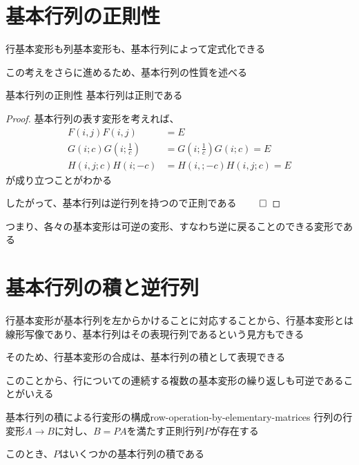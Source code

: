 \documentclass[../../../topic_linear-algebra]{subfiles}
\begin{document}
\sectionline
\section{基本行列の正則性}

行基本変形も列基本変形も、基本行列によって定式化できる

この考えをさらに進めるため、基本行列の性質を述べる

\begin{theorem*}{基本行列の正則性}
  基本行列は正則である
\end{theorem*}

\begin{proof}
  基本行列の表す変形を考えれば、
  \begin{align*}
    F(i,j)F(i,j)           & = E                          \\
    G(i;c)G(i;\frac{1}{c}) & = G(i;\frac{1}{c})G(i;c) = E \\
    H(i,j;c)H(i;-c)        & = H(i,;-c)H(i,j;c) = E
  \end{align*}
  が成り立つことがわかる

  したがって、基本行列は逆行列を持つので正則である $\qed$
\end{proof}

つまり、各々の基本変形は可逆の変形、すなわち逆に戻ることのできる変形である

\sectionline
\section{基本行列の積と逆行列}

行基本変形が基本行列を左からかけることに対応することから、行基本変形とは線形写像であり、基本行列はその表現行列であるという見方もできる

\br

そのため、行基本変形の合成は、基本行列の積として表現できる

\br

このことから、行についての連続する複数の基本変形の繰り返しも可逆であることがいえる

\begin{theorem}{基本行列の積による行変形の構成}{row-operation-by-elementary-matrices}
  行列の行変形$A \to B$に対し、$B=PA$を満たす正則行列$P$が存在する

  このとき、$P$はいくつかの基本行列の積である
\end{theorem}
\end{document}
